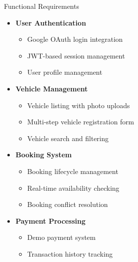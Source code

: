 \begin{frame}{Functional Requirements}
\begin{itemize}
    \item \textbf{User Authentication}
    \begin{itemize}
        \item Google OAuth login integration
        \item JWT-based session management
        \item User profile management
    \end{itemize}
    
    \item \textbf{Vehicle Management}
    \begin{itemize}
        \item Vehicle listing with photo uploads
        \item Multi-step vehicle registration form
        \item Vehicle search and filtering
    \end{itemize}
    
    \item \textbf{Booking System}
    \begin{itemize}
        \item Booking lifecycle management
        \item Real-time availability checking
        \item Booking conflict resolution
    \end{itemize}
    
    \item \textbf{Payment Processing}
    \begin{itemize}
        \item Demo payment system
        \item Transaction history tracking
    \end{itemize}
\end{itemize}
\end{frame}

